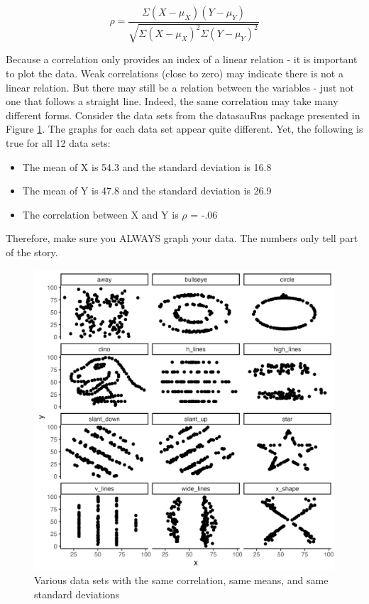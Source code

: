 \documentclass[
]{krantz}
\providecommand{\tightlist}{%
  \setlength{\itemsep}{0pt}\setlength{\parskip}{0pt}}
\begin{document}
\begin{equation} 
\rho =  \frac{\Sigma (X - \mu_X)(Y - \mu_Y)}{\sqrt{\Sigma (X - \mu_X)^2\Sigma (Y - \mu_Y)^2}}
      \label{eq:poprho4}
\end{equation}

Because a correlation only provides an index of a linear relation - it is important to plot the data. Weak correlations (close to zero) may indicate there is not a linear relation. But there may still be a relation between the variables - just not one that follows a straight line. Indeed, the same correlation may take many different forms. Consider the data sets from the datasauRus package presented in Figure \ref{fig:datarex}. The graphs for each data set appear quite different. Yet, the following is true for all 12 data sets:

\begin{itemize}
\tightlist
\item
  The mean of X is 54.3 and the standard deviation is 16.8
\item
  The mean of Y is 47.8 and the standard deviation is 26.9
\item
  The correlation between X and Y is \(\rho\) = -.06
\end{itemize}

Therefore, make sure you ALWAYS graph your data. The numbers only tell part of the story.

\begin{figure}
\includegraphics[width=0.8\linewidth,height=0.8\textheight]{ch_populations/images/datarex} \caption{Various data sets with the same correlation, same means, and same standard deviations}\label{fig:datarex}
\end{figure}
\end{document}
